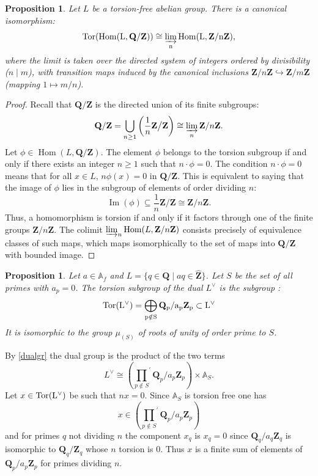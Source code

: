 \documentclass[11pt,a4paper]{article}
\newcommand{\Q}{\mathbf{Q}}
\newcommand{\Z}{\mathbf{Z}}
\newcommand{\A}{\mathbb{A}}
\newcommand{\Zhat}{\widehat{\Z}}
\theoremstyle{plain}
\newtheorem{prop}[thm]{Proposition}
\theoremstyle{definition} %
\begin{document}
\begin{prop}
Let $L$ be a torsion-free abelian group. There is a canonical isomorphism:
\[
\rm{Tor}( \operatorname{Hom}(L, \Q/\Z)) \cong \varinjlim_{n} \operatorname{Hom}(L, \Z/n\Z),
\]
where the limit is taken over the directed system of integers ordered by divisibility ($n \mid m$), with transition maps induced by the canonical inclusions $\Z/n\Z \hookrightarrow \Z/m\Z$ (mapping $1 \mapsto m/n$).
\end{prop}

\begin{proof}
Recall that $\Q/\Z$ is the directed union of its finite subgroups:
\[
\Q/\Z = \bigcup_{n \ge 1} \left( \frac{1}{n}\Z \big/ \Z \right) \cong \varinjlim_{n} \Z/n\Z.
\]
Let $\phi \in \operatorname{Hom}(L, \Q/\Z)$.
The element $\phi$ belongs to the torsion subgroup if and only if there exists an integer $n \ge 1$ such that $n \cdot \phi = 0$.
The condition $n \cdot \phi = 0$ means that for all $x \in L$, $n \phi(x) = 0$ in $\Q/\Z$.
This is equivalent to saying that the image of $\phi$ lies in the subgroup of elements of order dividing $n$:
\[
\operatorname{Im}(\phi) \subseteq \frac{1}{n}\Z \big/ \Z \cong \Z/n\Z.
\]
Thus, a homomorphism is torsion if and only if it factors through one of the finite groups $\Z/n\Z$.
The colimit $\varinjlim_{n} \operatorname{Hom}(L, \Z/n\Z)$ consists precisely of equivalence classes of such maps, which maps isomorphically to the set of maps into $\Q/\Z$ with bounded image.
\end{proof}
\begin{prop}\label{proptor} Let $a\in \A_f$ and $L=\{q\in \Q\mid aq\in \Zhat\}$. Let $S$ be the set of all primes with $a_p=0$. 
The torsion subgroup of the dual $L^\vee$ is the subgroup :
\[
\rm{Tor}(L^\vee) = \bigoplus_{p \notin S} \Q_p/a_p\Z_p \subset L^\vee
\]
It is isomorphic to the group $\mu_{(S)}$ of roots of unity of order prime to $S$.
\end{prop}
\proof By \eqref{dualgr} the dual group is the product of the two terms
$$
L^\vee \cong  \left({\prod_{p \notin S}}^{'} \Q_p/a_p\Z_p\right) \times \A_S.
$$
Let $x\in \rm{Tor}(L^\vee)$ be such that $nx=0$. Since $\A_S$ is torsion free one has
$$
x\in \left({\prod_{p \notin S}}^{'} \Q_p/a_p\Z_p\right)
$$
and for primes $q$ not dividing $n$ the component $x_q$ is $x_q=0$ since $\Q_q/a_q\Z_q$ is isomorphic to $\Q_q/\Z_q$ whose $n$ torsion is $0$. Thus $x$ is a finite sum of elements of $\Q_p/a_p\Z_p$ for primes dividing $n$.\endproof
\endproof 
\end{document}
